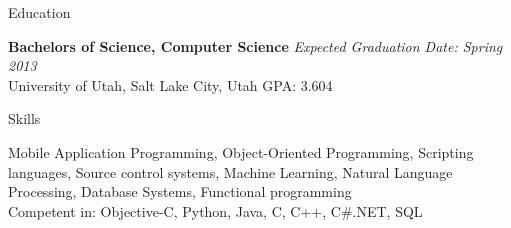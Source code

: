 \documentclass{resume}
\begin{document}
\begin{rSection}{Education}

{\bf Bachelors of Science, Computer Science} \hfill {\em Expected Graduation Date: Spring 2013} \\ 
University of Utah, Salt Lake City, Utah \hfill  GPA: 3.604

\end{rSection}


\begin{rSection}{Skills}

Mobile Application Programming, Object-Oriented Programming, Scripting languages,  Source control systems, Machine Learning, Natural Language Processing, Database Systems, Functional programming \\
Competent in: Objective-C, Python, Java, C, C++, C\#.NET, SQL

\end{rSection}

\end{document}
